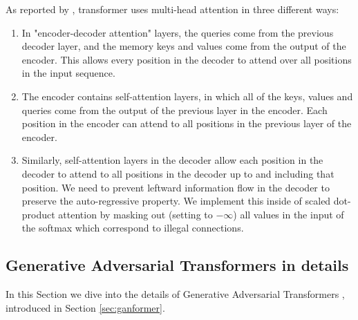 \documentclass{article}
\begin{document}
	As reported by \cite{vaswani2017attention}, transformer uses multi-head attention in three 
	different 
	ways:
	\begin{enumerate}
		\item In "encoder-decoder attention" layers, the queries come from the previous decoder 
		layer, 
		and the memory keys and values come from the output of the encoder. This allows every 
		position in the decoder to attend over all positions in the input sequence.
		\item The encoder contains self-attention layers, in which all of the keys, values 
		and queries come from the output of the previous layer in the encoder. 
		Each position in the encoder can attend to all positions in the previous layer of the encoder.
		\item Similarly, self-attention layers in the decoder allow each position in the decoder to 
		attend 
		to all positions in the decoder up to and including that position. We need to prevent leftward 
		information flow in the decoder to preserve the auto-regressive property. We implement 
		this 
		inside of scaled dot-product attention by masking out (setting to $-\infty$) all values in the 
		input of the softmax which correspond to illegal connections. 
	\end{enumerate}
	

	\subsection{Generative Adversarial Transformers in details}\label{subsec:app_methodology}
	In this Section we dive into the details of Generative Adversarial Transformers 
	\cite{hudson2021generative}, introduced in Section \ref{sec:ganformer}. 
	
\end{document}
